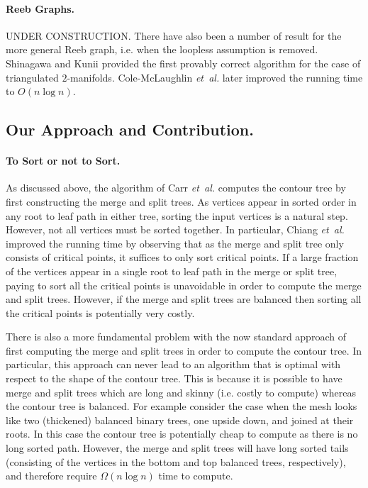 \documentclass[11pt]{article}
\theoremstyle{definition}
\newcommand{\etal}{\textit{et~al.}\xspace}
\begin{document}
\paragraph{Reeb Graphs.} UNDER CONSTRUCTION.
There have also been a number of result for the more general Reeb graph, i.e. when the loopless assumption is removed.  Shinagawa and Kunii \cite{sk-crgacs-91} provided the first provably correct algorithm for the case of triangulated $2$-manifolds. Cole-McLaughlin \etal \cite{cehnp-lrbm-03} later improved the running time to $O(n\log n)$.


\subsection{Our Approach and Contribution.}


\paragraph{To Sort or not to Sort.}
As discussed above, the algorithm of Carr \etal \cite{csa-cctad-00} computes the contour tree by first constructing the merge and split trees. 
As vertices appear in sorted order in any root to leaf path in either tree, sorting the input vertices is a natural step.  However, not all vertices must be sorted together.  In particular, Chiang \etal \cite{cllr-sooscctmp-05} improved the running time by observing that as the merge and split tree only consists of critical points, it suffices to only sort critical points.  
%
%
If a large fraction of the vertices appear in a single root to leaf path in the merge or split tree, paying to sort all the critical 
points is unavoidable in order to compute the merge and split trees.  However, if the merge and split trees are balanced then sorting all the critical points is potentially very costly.

There is also a more fundamental problem with the now standard approach of first computing the merge and split trees in order to compute the contour tree.  In particular, this approach can never lead to an algorithm that is optimal with respect to the shape of the contour tree.  This is because it is possible to have merge and split trees which are long and skinny (i.e. costly to compute) whereas the contour tree is balanced.  For example consider the case when the mesh looks like two (thickened) balanced binary trees, one upside down, and joined at their roots.  In this case the contour tree is potentially cheap to compute as there is no long sorted path.  However, the merge and split trees will have long sorted tails (consisting of the vertices in the bottom and top balanced trees, respectively), and therefore require $\Omega(n\log n)$ time to compute.  
\end{document}
